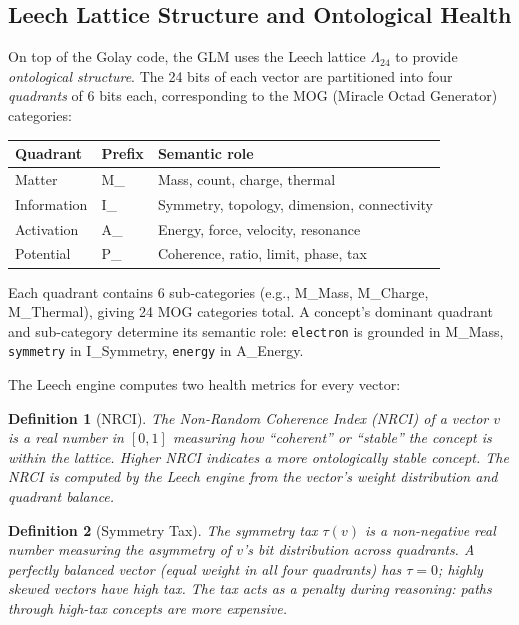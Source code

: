 \documentclass[11pt,a4paper]{article}
\newtheorem{definition}{Definition}
\begin{document}
\subsection{Leech Lattice Structure and Ontological Health}

On top of the Golay code, the GLM uses the Leech lattice $\Lambda_{24}$ to provide \emph{ontological structure}. The 24 bits of each vector are partitioned into four \emph{quadrants} of 6 bits each, corresponding to the MOG (Miracle Octad Generator) categories:

\begin{center}
\begin{tabular}{lll}
\toprule
\textbf{Quadrant} & \textbf{Prefix} & \textbf{Semantic role} \\
\midrule
Matter & M\_ & Mass, count, charge, thermal \\
Information & I\_ & Symmetry, topology, dimension, connectivity \\
Activation & A\_ & Energy, force, velocity, resonance \\
Potential & P\_ & Coherence, ratio, limit, phase, tax \\
\bottomrule
\end{tabular}
\end{center}

Each quadrant contains 6 sub-categories (e.g., M\_Mass, M\_Charge, M\_Thermal), giving 24 MOG categories total. A concept's dominant quadrant and sub-category determine its semantic role: \texttt{electron} is grounded in M\_Mass, \texttt{symmetry} in I\_Symmetry, \texttt{energy} in A\_Energy.

The Leech engine computes two health metrics for every vector:

\begin{definition}[NRCI]
The \emph{Non-Random Coherence Index} (NRCI) of a vector $v$ is a real number in $[0, 1]$ measuring how ``coherent'' or ``stable'' the concept is within the lattice. Higher NRCI indicates a more ontologically stable concept. The NRCI is computed by the Leech engine from the vector's weight distribution and quadrant balance.
\end{definition}

\begin{definition}[Symmetry Tax]
The \emph{symmetry tax} $\tau(v)$ is a non-negative real number measuring the asymmetry of $v$'s bit distribution across quadrants. A perfectly balanced vector (equal weight in all four quadrants) has $\tau = 0$; highly skewed vectors have high tax. The tax acts as a penalty during reasoning: paths through high-tax concepts are more expensive.
\end{definition}
\end{document}
